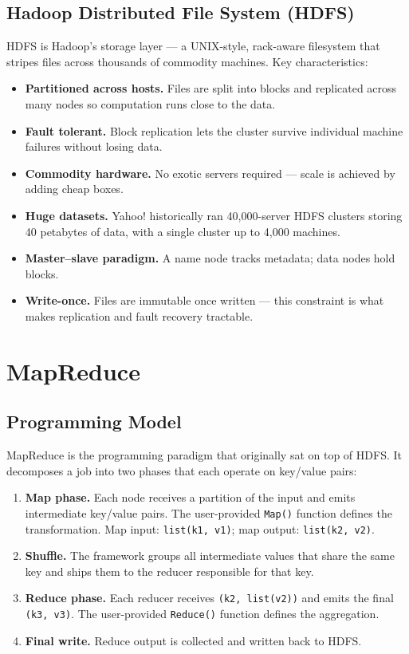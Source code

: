 \documentclass[11pt]{article}
\begin{document}
\subsection{Hadoop Distributed File System (HDFS)}
HDFS is Hadoop's storage layer --- a UNIX-style, rack-aware filesystem that stripes files across thousands of commodity machines. Key characteristics:

\begin{itemize}
    \item \textbf{Partitioned across hosts.} Files are split into blocks and replicated across many nodes so computation runs close to the data.
    \item \textbf{Fault tolerant.} Block replication lets the cluster survive individual machine failures without losing data.
    \item \textbf{Commodity hardware.} No exotic servers required --- scale is achieved by adding cheap boxes.
    \item \textbf{Huge datasets.} Yahoo! historically ran 40{,}000-server HDFS clusters storing 40 petabytes of data, with a single cluster up to 4{,}000 machines.
    \item \textbf{Master--slave paradigm.} A name node tracks metadata; data nodes hold blocks.
    \item \textbf{Write-once.} Files are immutable once written --- this constraint is what makes replication and fault recovery tractable.
\end{itemize}


\section{MapReduce}

\subsection{Programming Model}
MapReduce is the programming paradigm that originally sat on top of HDFS. It decomposes a job into two phases that each operate on key/value pairs:

\begin{enumerate}
    \item \textbf{Map phase.} Each node receives a partition of the input and emits intermediate key/value pairs. The user-provided \texttt{Map()} function defines the transformation. Map input: \texttt{list(k1, v1)}; map output: \texttt{list(k2, v2)}.
    \item \textbf{Shuffle.} The framework groups all intermediate values that share the same key and ships them to the reducer responsible for that key.
    \item \textbf{Reduce phase.} Each reducer receives \texttt{(k2, list(v2))} and emits the final \texttt{(k3, v3)}. The user-provided \texttt{Reduce()} function defines the aggregation.
    \item \textbf{Final write.} Reduce output is collected and written back to HDFS.
\end{enumerate}
\end{document}
